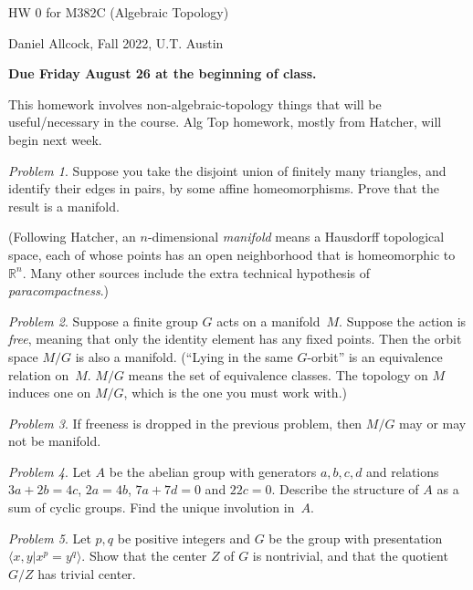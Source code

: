 \documentclass{amsart}
\theoremstyle{remark}
\newtheorem{exercise}{Problem}
\def\defn#1{\emph{#1}}
\def\R{\mathbb{R}}
\def\gend#1{\langle #1\rangle}
\begin{document}
HW 0 for M382C (Algebraic Topology) 

Daniel Allcock, Fall 2022, U.T. Austin

{\bf Due Friday August 26 at the beginning of class.}   

This homework involves non-algebraic-topology things that will
be useful/necessary in the course.  Alg Top homework, mostly from Hatcher,
will begin next week.

\begin{exercise}
    Suppose you take the disjoint union of
    finitely many triangles, and identify their edges
    in pairs, by some affine homeomorphisms.  Prove that the result is a manifold.

    (Following Hatcher, an $n$-dimensional 
\defn{manifold}
means a Hausdorff topological space, each of whose
points has an open neighborhood that is homeomorphic to $\R^n$.
Many other sources include the extra technical hypothesis
of \defn{paracompactness}.)
\end{exercise}

\begin{exercise}
    Suppose a finite group $G$ acts on a manifold~$M$.  Suppose
    the action is \defn{free}, meaning that only the identity
    element has any fixed points.  Then the orbit space $M/G$ is
    also a manifold.  (``Lying in the same $G$-orbit'' is an
    equivalence relation on~$M$.  $M/G$ means the set of equivalence
    classes.  The topology on $M$ induces one on $M/G$, which
    is the one you must work with.)
\end{exercise}

\begin{exercise}
    If freeness is dropped in the previous problem, then $M/G$
    may or may not be manifold.  
\end{exercise}

\begin{exercise}
    Let $A$ be the abelian group with generators $a,b,c,d$ and
    relations $3a+2b=4c$, $2a=4b$, $7a+7d=0$ and $22c=0$.  
    Describe the structure of $A$ as a sum of cyclic groups.
    Find the unique involution in~$A$.
\end{exercise}

\begin{exercise}
    Let $p,q$ be positive integers and
    $G$ be the group with presentation $\gend{x,y|x^p=y^q}$.
    Show that the center $Z$ of $G$ is nontrivial, and that the
    quotient $G/Z$ has trivial center.
\end{exercise}
\end{document}
